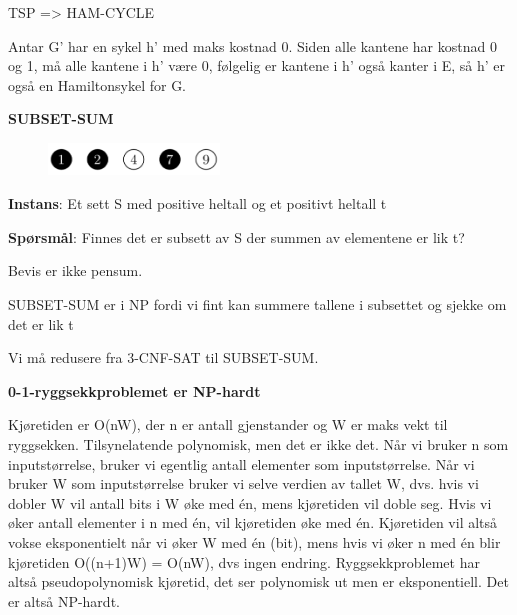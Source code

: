 \documentclass[12pt]{report}
\begin{document}
TSP => HAM-CYCLE\par

Antar G’ har en sykel h’ med maks kostnad 0. Siden alle kantene har kostnad 0 og 1, må alle kantene i h’ være 0, følgelig er kantene i h’ også kanter i E, så h’ er også en Hamiltonsykel for G. \par


\vspace{\baselineskip}
\textbf{SUBSET-SUM}\par




\begin{figure}[H]
\advance\leftskip 5.07in		\includegraphics[width=1.79in,height=0.34in]{./media/image165.png}
\end{figure}



\textbf{Instans}: Et sett S med positive heltall og et positivt heltall t\par

\textbf{Spørsmål}: Finnes det er subsett av S der summen av elementene er lik t?\par


\vspace{\baselineskip}
Bevis er ikke pensum. \par

SUBSET-SUM er i NP fordi vi fint kan summere tallene i subsettet og sjekke om det er lik t\par

Vi må redusere fra 3-CNF-SAT til SUBSET-SUM. \par


\vspace{\baselineskip}
\textbf{0-1-ryggsekkproblemet er NP-hardt}\par

Kjøretiden er O(nW), der n er antall gjenstander og W er maks vekt til ryggsekken. Tilsynelatende polynomisk, men det er ikke det. Når vi bruker n som inputstørrelse, bruker vi egentlig antall elementer som inputstørrelse. Når vi bruker W som inputstørrelse bruker vi selve verdien av tallet W, dvs. hvis vi dobler W vil antall bits i W øke med én, mens kjøretiden vil doble seg. Hvis vi øker antall elementer i n med én, vil kjøretiden øke med én. Kjøretiden vil altså vokse eksponentielt når vi øker W med én (bit), mens hvis vi øker n med én blir kjøretiden O((n+1)W) = O(nW), dvs ingen endring. Ryggsekkproblemet har altså pseudopolynomisk kjøretid, det ser polynomisk ut men er eksponentiell. Det er altså NP-hardt. \par
\end{document}
